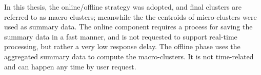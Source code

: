 In this thesis, the online/offline strategy was adopted, and final clusters are referred to as macro-clusters; meanwhile the the centroids of micro-clusters were used as summary data. The online component requires a process for saving the summary data in a fast manner, and is not requested to support real-time processing, but rather a very low response delay. The offline phase uses the aggregated summary data to compute the macro-clusters. It is not time-related and can happen any time by user request.




    









